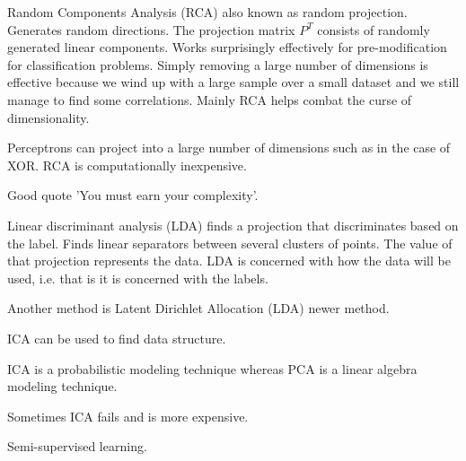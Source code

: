 \documentclass{article}
\begin{document}
Random Components Analysis (RCA) also known as random projection. Generates
random directions. The projection matrix $P^T$ consists of randomly generated
linear components. Works surprisingly effectively for pre-modification for 
classification problems. Simply removing a large number of dimensions is
effective because we wind up with a large sample over a small dataset and we 
still manage to find some correlations. Mainly RCA helps combat the curse of 
dimensionality. 

Perceptrons can project into a large number of dimensions such as in the case of
XOR. RCA is computationally inexpensive. 

Good quote 'You must earn your complexity'.

Linear discriminant analysis (LDA) finds a projection that discriminates based
on the label. Finds linear separators between several clusters of points. The
value of that projection represents the data. LDA is concerned with how the 
data will be used, i.e. that is it is concerned with the labels. 

Another method is Latent Dirichlet Allocation (LDA) newer method. 

ICA can be used to find data structure. 

ICA is a probabilistic modeling technique whereas PCA is a linear algebra
modeling technique. 

Sometimes ICA fails and is more expensive.

Semi-supervised learning. 
\end{document}
